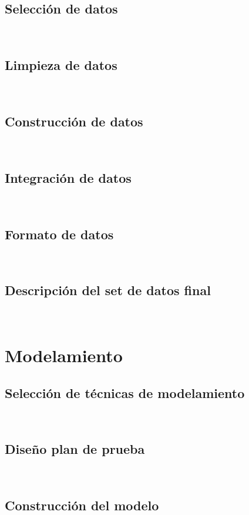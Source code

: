 \subsection{Selección de datos}
\blindtext\\
\subsection{Limpieza de datos}
\blindtext\\
\subsection{Construcción de datos}
\blindtext\\
\subsection{Integración de datos}
\blindtext\\
\subsection{Formato de datos}
\blindtext\\
\subsection{Descripción del set de datos final}
\blindtext\\

\section{Modelamiento}
\blindtext
\subsection{Selección de técnicas de modelamiento}
\blindtext\\
\subsection{Diseño plan de prueba}
\blindtext\\
\subsection{Construcción del modelo}
\blindtext\\


